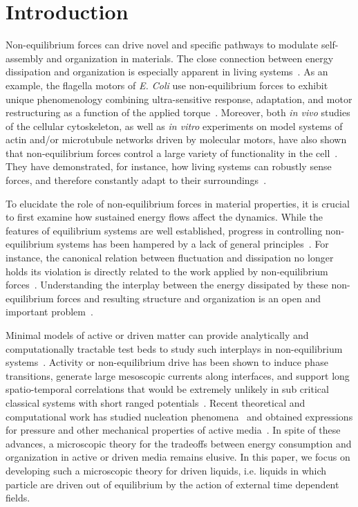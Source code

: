 \documentclass[pre, superscriptaddress, twocolumn,pre]{revtex4-1}
\begin{document}
\section{Introduction}

Non-equilibrium forces can drive novel and specific pathways to modulate self-assembly and organization in materials. The close connection between energy dissipation and organization is especially apparent in living systems~\cite{Toyabe2010, Ahmed2016, Battle604}. As an example, the flagella motors of {\it E. Coli} use non-equilibrium forces to exhibit unique phenomenology combining ultra-sensitive response, adaptation, and motor restructuring as a function of the applied torque~\cite{Lele2013, Lan2012, Wang2017}. Moreover, both {\it in vivo} studies of the cellular cytoskeleton, as well as {\it in vitro} experiments on model systems of actin and/or microtubule networks driven by molecular motors, have also shown that non-equilibrium forces control a large variety of functionality in the cell~\cite{Silva2011, Sanchez2012, Blanchoin2014, Murrell2015}. They have demonstrated, for instance, how living systems can robustly sense forces, and therefore constantly adapt to their surroundings~\cite{Decamp2015}. 


To elucidate the role of non-equilibrium forces in material properties, it is crucial to first examine how sustained energy flows affect the dynamics. While the features of equilibrium systems are well established, progress in controlling non-equilibrium systems has been hampered by a lack of general principles~\cite{Takatori2015, Cates2015, Solon2015a, Nguyen2016, Fodor2016, Murugan2017, Nguyen2018}. For instance, the canonical relation between fluctuation and dissipation no longer holds \textendash its violation is directly related to the work applied by non-equilibrium forces~\cite{Harada2005, Harada2006}. Understanding the interplay between the energy dissipated by these non-equilibrium forces and resulting structure and organization is an open and important problem~\cite{Mizuno2007, Wilhelm2008, Visco2015, Turlier2016, Nardini2017}.

Minimal models of active or driven matter can provide analytically and computationally tractable test beds to study such interplays in non-equilibrium systems~\cite{Cates2015,Han2016}. Activity or non-equilibrium drive has been shown to induce phase transitions, generate large mesoscopic currents along interfaces, and support long spatio-temporal correlations that would be extremely unlikely in sub critical classical systems with short ranged potentials~\cite{Cates2015,Han2016,Nguyen2014b}.  Recent theoretical and computational work has studied nucleation phenomena~\cite{Redner2016} and obtained expressions for pressure and other mechanical properties of active media~\cite{Solon2015a}. In spite of these advances, a microscopic theory for the tradeoffs between energy consumption and organization in active or driven media remains elusive. In this paper, we focus on developing such a microscopic theory for driven liquids, i.e. liquids in which particle are driven out of equilibrium by the action of external time dependent fields. 
\end{document}
